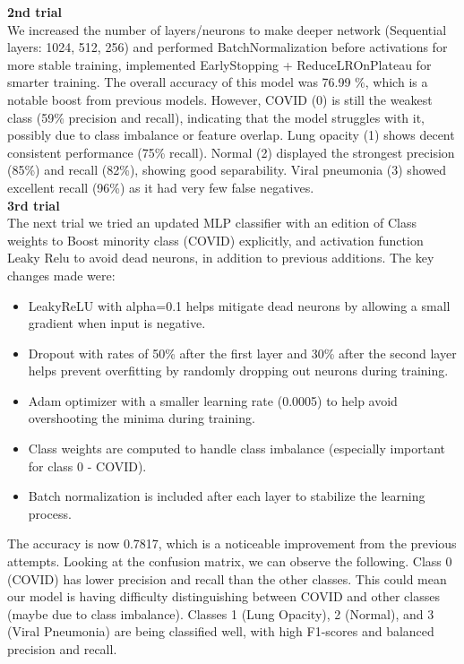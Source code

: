 \documentclass{article}
\begin{document}
\textbf{2nd trial}\\
We increased the number of layers/neurons to make deeper network (Sequential layers: 1024, 512, 256)
and performed BatchNormalization before activations for more stable training, implemented EarlyStopping + ReduceLROnPlateau for smarter training.
The overall accuracy of this model was 76.99 \%, which is a notable boost from previous models. However, COVID (0) is still the weakest class (59\% precision and recall), indicating that the model struggles with it, possibly due to class imbalance or feature overlap. Lung opacity (1) shows decent consistent performance (75\% recall). Normal (2) displayed the strongest precision (85\%) and recall (82\%), showing good separability. Viral pneumonia (3) showed excellent recall (96\%) as it had very few false negatives.\\

\textbf{3rd trial}\\

The next trial  we tried an updated MLP classifier with an edition of Class weights to Boost minority class (COVID) explicitly, and activation function Leaky Relu to avoid dead neurons, in addition to previous additions. The key changes made were:

 \begin{itemize}
     \item LeakyReLU with alpha=0.1 helps mitigate dead neurons by allowing a small gradient when input is negative.
     \item Dropout with rates of 50\% after the first layer and 30\% after the second layer helps prevent overfitting by randomly dropping out neurons during training.
     \item Adam optimizer with a smaller learning rate (0.0005) to help avoid overshooting the minima during training.
     \item Class weights are computed to handle class imbalance (especially important for class 0 - COVID).
     \item Batch normalization is included after each layer to stabilize the learning process.
\end{itemize}
The accuracy is now 0.7817, which is a noticeable improvement from the previous attempts. Looking at the confusion matrix, we can observe the following. Class 0 (COVID) has lower precision and recall than the other classes. This could mean our model is having difficulty distinguishing between COVID and other classes (maybe due to class imbalance). Classes 1 (Lung Opacity), 2 (Normal), and 3 (Viral Pneumonia) are being classified well, with high F1-scores and balanced precision and recall.\\
\end{document}
